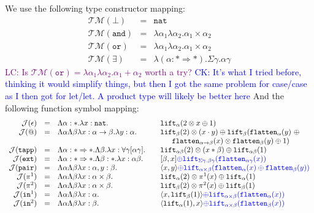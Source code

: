 \documentclass[runningheads,a4paper]{llncs}
\newcommand{\Typemap}{\mathcal{T\!M}}
\newcommand{\Termmap}{\mathcal{J}}
\newcommand{\quant}[2]{\forall #1[#2]}
\newcommand{\arrtype}{\rightarrow}
\newcommand{\arrkind}{\Rightarrow}
\newcommand{\pair}[2]{\langle #1,#2 \rangle}
\newcommand{\expair}[2]{[#1,#2]}
\newcommand{\nat}{\mathtt{nat}}
\newcommand{\flatten}{\mathtt{flatten}}
\newcommand{\lift}{\mathtt{lift}}
\newcommand{\CK}[1]{\textcolor{blue}{CK: #1}}
\newcommand{\CKchange}[1]{\textcolor{blue}{#1}}
\newcommand{\LC}[1]{\textcolor{purple}{LC: #1}}
\begin{document}
We use the following type constructor mapping:
\[
\begin{array}{rcl}
\Typemap(\bot) & = & \nat \\
\Typemap(\mathtt{and}) & = & \lambda\alpha_1\lambda\alpha_2 . \alpha_1\times\alpha_2 \\
\Typemap(\mathtt{or}) & = & \lambda\alpha_1\lambda\alpha_2 . \alpha_1\times\alpha_2 \\
\Typemap(\exists) & = & \lambda(\alpha : * \arrkind *) . \Sigma \gamma . \alpha \gamma
\end{array}
\]
\LC{Is $\Typemap(\mathtt{or}) = \lambda\alpha_1\lambda\alpha_2 . \alpha_1+\alpha_2$ worth a try?}
\CK{It's what I tried before, thinking it would simplify things, but
  then I got the same problem for case/case as I then got for let/let.
  A product type will likely be better here}
And the following function symbol mapping:
\[
\begin{array}{rcll}
\Termmap(\epsilon) & = & \Lambda \alpha:* . \lambda x:\nat. &
  \mathtt{lift}_\alpha(2 \otimes x \oplus 1) \\
\Termmap(@) & = & \Lambda\alpha\Lambda\beta\lambda x: \alpha \arrtype \beta . \lambda y :
  \alpha . \quad & \lift_\beta(2) \otimes (x \cdot y) \oplus
  \lift_\beta(\flatten_\alpha(y)\ \oplus \\
  & & & \phantom{AB}\flatten_{\alpha \arrtype \beta}(x) \otimes
  \flatten_\beta(y) \oplus 1) \\
\Termmap(\mathtt{tapp}) & = & \Lambda \alpha : * \arrkind * . \Lambda \beta . \lambda x : \quant{\gamma}{\alpha\gamma} . \quad &
  \lift_{\alpha\beta}(2) \otimes
  (x * \beta) \oplus \lift_{\alpha\beta}(1) \\
\Termmap(\mathtt{ext}) & = & \Lambda \alpha : * \arrkind * . \Lambda \beta : * . \lambda x:\alpha\beta . &
  \expair{\beta}{x} \CKchange{\oplus \lift_{\Sigma\gamma.\beta\gamma}(
  \flatten_{\alpha\gamma}(x))} \\
\Termmap(\mathtt{pair}) & = & \Lambda \alpha \Lambda \beta \lambda x :
  \alpha, y : \beta.\quad & \pair{x}{y} \CKchange{\oplus \lift_{
  \alpha \times \beta}(\flatten_\alpha(x) \oplus \flatten_{\beta}(y))} \\
\Termmap(\pi^1) & = & \Lambda \alpha \Lambda \beta \lambda x :
  \alpha \times \beta . \quad
  & \lift_\alpha(2) \otimes \pi^1(x) \oplus \lift_{\alpha}(1) \\
\Termmap(\pi^2) & = & \Lambda \alpha \Lambda \beta \lambda x :
  \alpha\times\beta.\quad
  & \lift_\beta(2) \otimes \pi^2(x) \oplus \lift_{\beta}(1) \\
\Termmap(\mathtt{in}^1) & = & \Lambda \alpha \Lambda \beta
  \lambda x : \alpha.\quad & \pair{x}{\lift_\beta(1)}
  \CKchange{\oplus \lift_{\alpha
  \times \beta}(\flatten_{\alpha}(x))} \\
\Termmap(\mathtt{in}^2) & = & \Lambda \alpha \Lambda \beta
  \lambda x : \beta.\quad & \pair{\lift_\alpha(1)}{x}
  \CKchange{\oplus \lift_{\alpha \times \beta}(\flatten_{\beta}(x))} \\
\end{array}
\]
\end{document}
